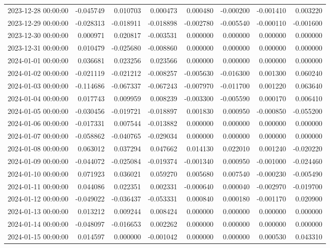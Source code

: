 \begin{tabular}{lrrrrrrr}
2023-12-28 00:00:00 & -0.045749 & 0.010703 & 0.000473 & 0.000480 & -0.000200 & -0.001410 & 0.003220 \\
2023-12-29 00:00:00 & -0.028313 & -0.018911 & -0.018898 & -0.002780 & -0.005540 & -0.000110 & -0.001600 \\
2023-12-30 00:00:00 & 0.000971 & 0.020817 & -0.003531 & 0.000000 & 0.000000 & 0.000000 & 0.000000 \\
2023-12-31 00:00:00 & 0.010479 & -0.025680 & -0.008860 & 0.000000 & 0.000000 & 0.000000 & 0.000000 \\
2024-01-01 00:00:00 & 0.036681 & 0.023256 & 0.023566 & 0.000000 & 0.000000 & 0.000000 & 0.000000 \\
2024-01-02 00:00:00 & -0.021119 & -0.021212 & -0.008257 & -0.005630 & -0.016300 & 0.001300 & 0.060240 \\
2024-01-03 00:00:00 & -0.114686 & -0.067337 & -0.067243 & -0.007970 & -0.011700 & 0.001220 & 0.063640 \\
2024-01-04 00:00:00 & 0.017743 & 0.009959 & 0.008239 & -0.003300 & -0.005590 & 0.000170 & 0.006410 \\
2024-01-05 00:00:00 & -0.030456 & -0.019721 & -0.018897 & 0.001830 & 0.000950 & -0.000850 & -0.055200 \\
2024-01-06 00:00:00 & -0.017331 & 0.007544 & -0.013882 & 0.000000 & 0.000000 & 0.000000 & 0.000000 \\
2024-01-07 00:00:00 & -0.058862 & -0.040765 & -0.029034 & 0.000000 & 0.000000 & 0.000000 & 0.000000 \\
2024-01-08 00:00:00 & 0.063012 & 0.037294 & 0.047662 & 0.014130 & 0.022010 & 0.001240 & -0.020220 \\
2024-01-09 00:00:00 & -0.044072 & -0.025084 & -0.019374 & -0.001340 & 0.000950 & -0.001000 & -0.024460 \\
2024-01-10 00:00:00 & 0.071923 & 0.036021 & 0.059270 & 0.005680 & 0.007540 & -0.000230 & -0.005490 \\
2024-01-11 00:00:00 & 0.044086 & 0.022351 & 0.002331 & -0.000640 & 0.000040 & -0.002970 & -0.019700 \\
2024-01-12 00:00:00 & -0.049022 & -0.036437 & -0.053331 & 0.000840 & 0.000180 & -0.001170 & 0.020900 \\
2024-01-13 00:00:00 & 0.013212 & 0.009244 & 0.008424 & 0.000000 & 0.000000 & 0.000000 & 0.000000 \\
2024-01-14 00:00:00 & -0.048097 & -0.016653 & 0.002262 & 0.000000 & 0.000000 & 0.000000 & 0.000000 \\
2024-01-15 00:00:00 & 0.014597 & 0.000000 & -0.001042 & 0.000000 & 0.000000 & 0.000530 & 0.043310 \\

\end{tabular}
